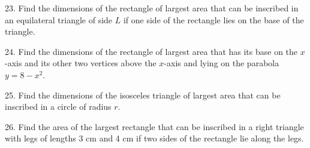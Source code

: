 \documentclass{sebase}
\begin{document}
\begin{multicols}{2}
\begin{ExerciseList}
%

\item[\hfill 23.] Find the dimensions of the rectangle of largest area that
can be inscribed in an equilateral triangle of side $L$ if one side of the
rectangle lies on the base of the triangle.

%

%

\item[\hfill 24.] Find the dimensions of the rectangle of largest area that
has its base on the $x$-axis and its other two vertices above the $x$-axis
and lying on the parabola $y=8-x^{2}$.

%

\item[\hfill 25.] Find the dimensions of the isosceles triangle of largest
area that can be inscribed in a circle of radius $r$.

%

%

\item[\hfill 26.] Find the area of the largest rectangle that can be
inscribed in a right triangle with legs of lengths 3 cm and 4 cm if two
sides of the rectangle lie along the legs.

%


\end{ExerciseList}
\end{multicols}
\end{document}
